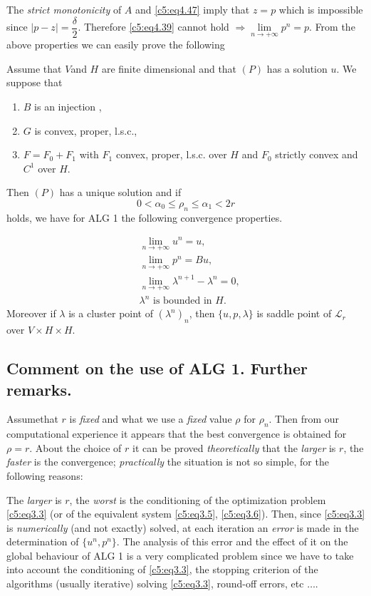 The \textit{strict monotonicity} of $A$ and \eqref{c5:eq4.47} imply
that $z = p$ which is impossible since $| p -z | =
\dfrac{\delta}{2}$. Therefore \eqref{c5:eq4.39} cannot hold
$\Rightarrow \lim\limits_{n \to + \infty} p^n = p$. From the above
properties we can easily prove the following 

\begin{theorem}\label{c5:thm4.2}%
Assume that $V$and $H$ are finite dimensional and that $(P)$ has a
solution $u$. We suppose that 
\begin{enumerate}[-]
\item $B$  is an injection ,
\item $G$ is convex, proper, l.s.c.,
\item $F = F_0 + F_1 $ with  $F_1$  convex, proper, l.s.c. over  $H$
  and  $F_0$ strictly convex and  $C^1$  over $H$. 
\end{enumerate}
Then $(P) $ has a unique solution and if 
$$
0 < \alpha_0 \leq \rho_n \leq \alpha_1 < 2r
$$
holds, we have for ALG 1 the following convergence properties.
 
  \begin{align*}
& \lim\limits_{n \to + \infty} u^n = u,\\
& \lim\limits_{n \to + \infty} p^n = Bu,\\
& \lim\limits_{n \to + \infty} \lambda^{n+1} - \lambda^n = 0,\\
& \lambda^n \text{ is bounded in }H.
 \end{align*}  
 Moreover if $\lambda$ is a cluster point of $(\lambda^n)_n$, then $\{u , p, \lambda \}$ is saddle point of $\mathscr{L}_r$ over $V \times H  \times H$.
\end{theorem}  

  \subsection{Comment on the use of ALG 1. Further 
  remarks.}\label{c5:ss4.3}%
  
  Assume\pageoriginale  that $r$ is \textit{fixed} and what we use a \textit{fixed} value $\rho$ for $\rho_n$. Then from our  computational experience it appears that the best convergence is obtained for $\rho = r$. About the choice of $r$ it can be proved \textit{theoretically} that the \textit{larger} is $r$, the \textit{faster} is the convergence; \textit{practically} the situation is not so simple, for the following reasons:
  
  The \textit{larger} is $r$, the \textit{worst} is the conditioning
  of the optimization problem \eqref{c5:eq3.3} (or of the equivalent
  system \eqref{c5:eq3.5}, \eqref{c5:eq3.6}). Then, since
  \eqref{c5:eq3.3} is \textit{numerically} (and not exactly) solved,
  at each iteration an \textit{error} is made in the determination of
  $\{u^n, p^n \}$. The analysis of this error and the effect of it on
  the global behaviour of ALG 1 is a very complicated problem since we
  have to take into account the conditioning of \eqref{c5:eq3.3}, the
  stopping criterion of the algorithms (usually iterative) solving
  \eqref{c5:eq3.3}, round-off errors, etc $\ldots$.
  
